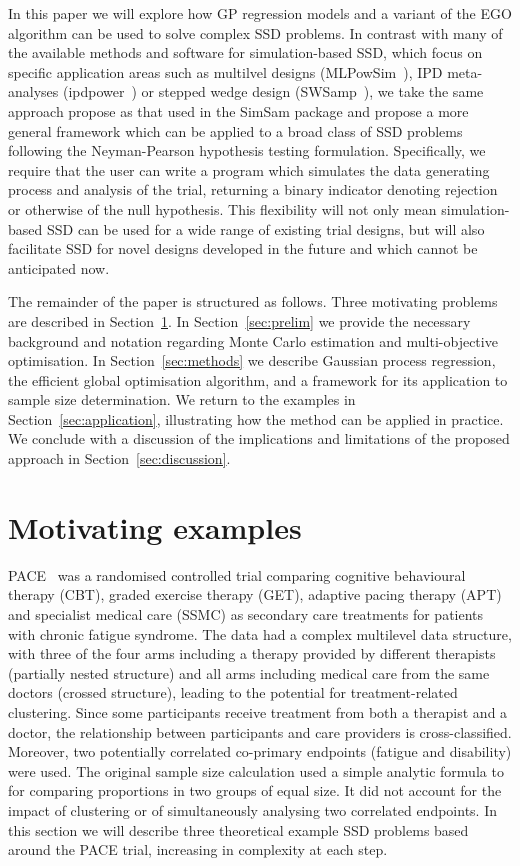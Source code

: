 \documentclass[]{sagej}
\begin{document}
In this paper we will explore how GP regression models and a variant of the EGO algorithm can be used to solve complex SSD problems. In contrast with many of the available methods and software for simulation-based SSD, which focus on specific application areas such as multilvel designs (MLPowSim~\cite{Browne2009}), IPD meta-analyses (ipdpower~\cite{Kontopantelis2016}) or stepped wedge design (SWSamp~\cite{Baio2015}), we take the same approach propose as that used in the SimSam package \cite{Hooper2013} and propose a more general framework which can be applied to a broad class of SSD problems following the Neyman-Pearson hypothesis testing formulation. Specifically, we require that the user can write a program which simulates the data generating process and analysis of the trial, returning a binary indicator denoting rejection or otherwise of the null hypothesis. This flexibility will not only mean simulation-based SSD can be used for a wide range of existing trial designs, but will also facilitate SSD for novel designs developed in the future and which cannot be anticipated now.

The remainder of the paper is structured as follows. Three motivating problems are described in Section~\ref{sec:examples}. In Section~\ref{sec:prelim} we provide the necessary background and notation regarding Monte Carlo estimation and multi-objective optimisation. In Section~\ref{sec:methods} we describe Gaussian process regression, the efficient global optimisation algorithm, and a framework for its application to sample size determination. We return to the examples in Section~\ref{sec:application}, illustrating how the method can be applied in practice. We conclude with a discussion of the implications and limitations of the proposed approach in Section~\ref{sec:discussion}.

\section{Motivating examples}\label{sec:examples}

PACE~\cite{White2007, White2011} was a randomised controlled trial comparing cognitive behavioural therapy (CBT), graded exercise therapy (GET), adaptive pacing therapy (APT) and specialist medical care (SSMC) as secondary care treatments for patients with chronic fatigue syndrome. The data had a complex multilevel data structure, with three of the four arms including a therapy provided by different therapists (partially nested structure) and all arms including medical care from the same doctors (crossed structure), leading to the potential for treatment-related clustering. Since some participants receive treatment from both a therapist and a doctor, the relationship between participants and care providers is cross-classified. Moreover, two potentially correlated co-primary endpoints (fatigue and disability) were used. The original sample size calculation used a simple analytic formula to for comparing proportions in two groups of equal size. It did not account for the impact of clustering or of simultaneously analysing two correlated endpoints. In this section we will describe three theoretical example SSD problems based around the PACE trial, increasing in complexity at each step. 
\end{document}
